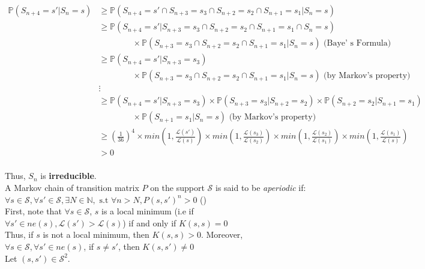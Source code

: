 $
\begin{aligned}
    \mathbb{P}(S_{n+4}=s'\vert S_n = s) & \geqslant \mathbb{P}(S_{n+4} = s' \cap  S_{n+3}= s_3 \cap S_{n+2} = s_2 \cap S_{n+1} = s_1 \vert S_n = s) \\
    & \geqslant \mathbb{P}(S_{n+4} = s' \vert S_{n+3} = s_3 \cap S_{n+2} = s_2 \cap S_{n+1} = s_1 \cap S_n = s) \\
    & \quad\quad\quad\quad \times \mathbb{P}(S_{n+3} = s_3 \cap S_{n+2} = s_2 \cap S_{n+1} = s_1 \vert S_n = s) \text{  (Baye' s Formula)}\\
    & \geqslant \mathbb{P}(S_{n+4} = s' \vert S_{n+3} = s_3)\\
    & \quad\quad\quad\quad  \times \mathbb{P}(S_{n+3} = s_3 \cap S_{n+2} = s_2 \cap S_{n+1} = s_1 \vert S_n = s)  \text{ (by Markov's property)}\\
    & \vdots \\
    & \geqslant \mathbb{P}(S_{n+4} = s' \vert S_{n+3} = s_3) \times \mathbb{P}(S_{n+3} = s_3 \vert S_{n+2} = s_2) \times \mathbb{P}(S_{n+2} = s_2 \vert S_{n+1} = s_1) \\
    & \quad\quad\quad\quad \times \mathbb{P}(S_{n+1} = s_1 \vert S_n = s) \text{ (by Markov's property)}\\
    & \geqslant (\frac{1}{36})^4 \times min (1, \frac{\mathcal{L}(s')}{\mathcal{L}(s)}) \times min (1, \frac{\mathcal{L}(s_3)}{\mathcal{L}(s_2)}) \times min (1, \frac{\mathcal{L}(s_2)}{\mathcal{L}(s_1)}) \times min (1, \frac{\mathcal{L}(s_1)}{\mathcal{L}(s)})  \\
    & > 0 \\
\end{aligned}
$

Thus, $S_n$ is \textbf{irreducible}.\\

A Markov chain of transition matrix $P$ on the support $\mathcal{S}$ is said to be \textit{aperiodic} if: \\
$\forall s \in \mathcal{S}, \forall s' \in \mathcal{S}, \exists N \in \mathbb{N}, \text{ s.t } \forall n > N, P(s, s')^n >0 $ (\cite{bodineau2015modelisation})\\

First, note that $\forall s \in \mathcal{S}$,  $s$ is a local minimum (i.e if $\forall s' \in ne(s), \mathcal{L}(s') > \mathcal{L}(s) $) if and only if $K(s,s)=0$\\

Thus, if $s$ is not a local minimum, then $K(s, s)>0$. Moreover, $ \forall s \in \mathcal{S}, \forall s' \in ne(s)$, if $s\neq s'$, then $K(s, s') \neq 0 $\\[0.3cm]
Let $(s, s')  \in \mathcal{S}^2$. \\

